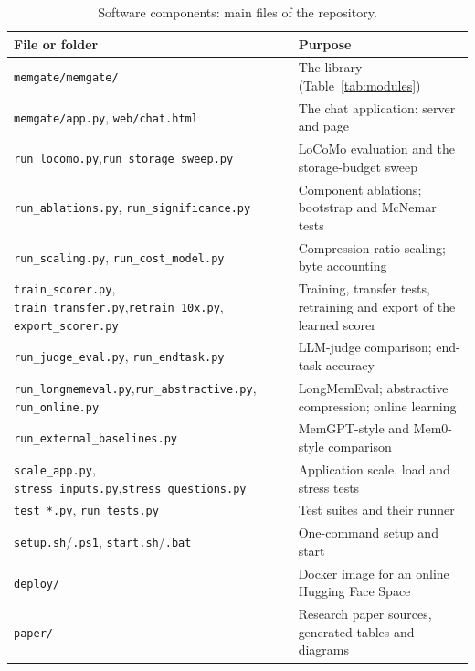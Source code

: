 \begin{table}[htbp]
\caption{Software components: main files of the repository.}
\label{tab:files}
\centering
\fontsize{9}{11}\selectfont
\begin{tabularx}{\textwidth}{@{}>{\raggedright\arraybackslash}p{6.4cm}>{\raggedright\arraybackslash}X@{}}
\toprule
\textbf{File or folder} & \textbf{Purpose} \\
\midrule
\texttt{memgate/memgate/} & The library (Table~\ref{tab:modules}) \\
\texttt{memgate/app.py}, \texttt{web/chat.html} & The chat application: server and page \\
\texttt{run\_locomo.py},\newline \texttt{run\_storage\_sweep.py} & LoCoMo evaluation and the storage-budget sweep \\
\texttt{run\_ablations.py}, \texttt{run\_significance.py} & Component ablations; bootstrap and McNemar tests \\
\texttt{run\_scaling.py}, \texttt{run\_cost\_model.py} & Compression-ratio scaling; byte accounting \\
\texttt{train\_scorer.py}, \texttt{train\_transfer.py},\newline \texttt{retrain\_10x.py}, \texttt{export\_scorer.py} & Training, transfer tests, retraining and export of the learned scorer \\
\texttt{run\_judge\_eval.py}, \texttt{run\_endtask.py} & LLM-judge comparison; end-task accuracy \\
\texttt{run\_longmemeval.py},\newline \texttt{run\_abstractive.py}, \texttt{run\_online.py} & LongMemEval; abstractive compression; online learning \\
\texttt{run\_external\_baselines.py} & MemGPT-style and Mem0-style comparison \\
\texttt{scale\_app.py}, \texttt{stress\_inputs.py},\newline \texttt{stress\_questions.py} & Application scale, load and stress tests \\
\texttt{test\_*.py}, \texttt{run\_tests.py} & Test suites and their runner \\
\texttt{setup.sh}/\texttt{.ps1}, \texttt{start.sh}/\texttt{.bat} & One-command setup and start \\
\texttt{deploy/} & Docker image for an online Hugging Face Space \\
\texttt{paper/} & Research paper sources, generated tables and diagrams \\
\bottomrule
\end{tabularx}
\end{table}

